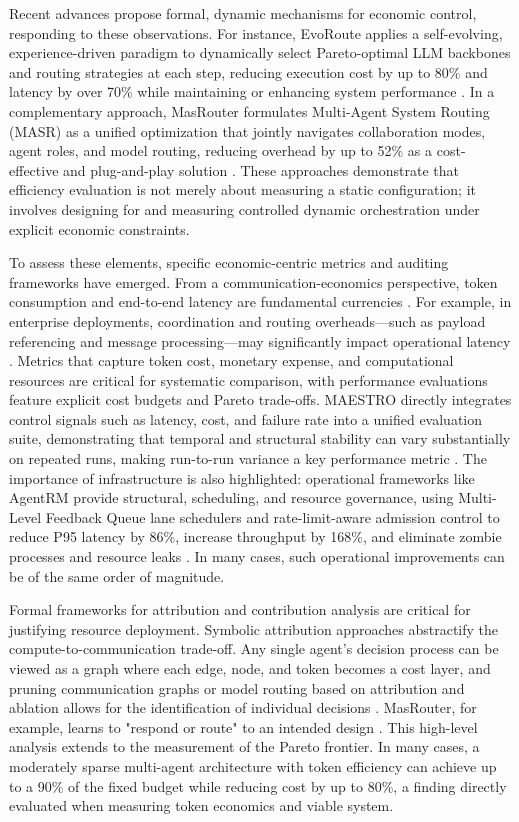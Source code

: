 \documentclass[11pt,a4paper]{article}
\begin{document}
Recent advances propose formal, dynamic mechanisms for economic control, responding to these observations. For instance, EvoRoute applies a self-evolving, experience-driven paradigm to dynamically select Pareto-optimal LLM backbones and routing strategies at each step, reducing execution cost by up to 80\% and latency by over 70\% while maintaining or enhancing system performance \cite{arxiv:2601.02695v1}. In a complementary approach, MasRouter formulates Multi-Agent System Routing (MASR) as a unified optimization that jointly navigates collaboration modes, agent roles, and model routing, reducing overhead by up to 52\% as a cost-effective and plug-and-play solution \cite{arxiv:2502.11133v1}. These approaches demonstrate that efficiency evaluation is not merely about measuring a static configuration; it involves designing for and measuring controlled dynamic orchestration under explicit economic constraints.

To assess these elements, specific economic-centric metrics and auditing frameworks have emerged. From a communication-economics perspective, token consumption and end-to-end latency are fundamental currencies \cite{arxiv:2506.12508v6,arxiv:2602.06511v4,arxiv:2505.16988v2}. For example, in enterprise deployments, coordination and routing overheads---such as payload referencing and message processing---may significantly impact operational latency \cite{arxiv:2412.05449v1}. Metrics that capture token cost, monetary expense, and computational resources are critical for systematic comparison, with performance evaluations feature explicit cost budgets and Pareto trade-offs. MAESTRO directly integrates control signals such as latency, cost, and failure rate into a unified evaluation suite, demonstrating that temporal and structural stability can vary substantially on repeated runs, making run-to-run variance a key performance metric \cite{arxiv:2601.00481v1}. The importance of infrastructure is also highlighted: operational frameworks like AgentRM provide structural, scheduling, and resource governance, using Multi-Level Feedback Queue lane schedulers and rate-limit-aware admission control to reduce P95 latency by 86\%, increase throughput by 168\%, and eliminate zombie processes and resource leaks \cite{arxiv:2508.04482v1}. In many cases, such operational improvements can be of the same order of magnitude.

Formal frameworks for attribution and contribution analysis are critical for justifying resource deployment. Symbolic attribution approaches abstractify the compute-to-communication trade-off. Any single agent's decision process can be viewed as a graph where each edge, node, and token becomes a cost layer, and pruning communication graphs or model routing based on attribution and ablation allows for the identification of individual decisions \cite{arxiv:2410.02506v1,arxiv:2601.12307v1}. MasRouter, for example, learns to "respond or route" to an intended design \cite{arxiv:2502.11133v1}. This high-level analysis extends to the measurement of the Pareto frontier. In many cases, a moderately sparse multi-agent architecture with token efficiency can achieve up to a 90\% of the fixed budget while reducing cost by up to 80\%, a finding directly evaluated when measuring token economics and viable system.
\end{document}
